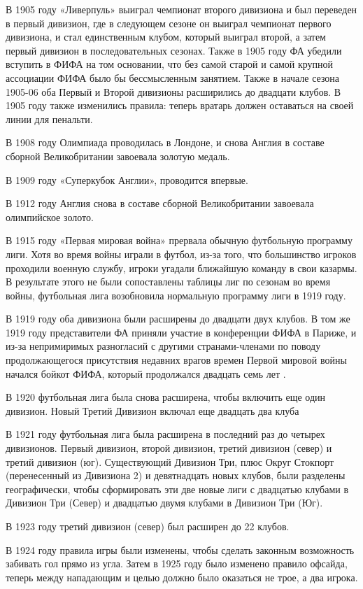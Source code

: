 В 1905 году «Ливерпуль» выиграл чемпионат второго дивизиона и был переведен в первый дивизион, где в следующем сезоне он выиграл чемпионат первого дивизиона, и стал единственным клубом, который выиграл второй, а затем первый дивизион в последовательных сезонах. Также в 1905 году ФА убедили вступить в ФИФА на том основании, что без самой старой и самой крупной ассоциации ФИФА было бы бессмысленным занятием. Также в начале сезона 1905-06 оба Первый и Второй дивизионы расширились до двадцати клубов.  В 1905 году также изменились правила: теперь вратарь должен оставаться на своей линии для пенальти.

В 1908 году Олимпиада проводилась в Лондоне, и снова Англия в составе сборной Великобритании завоевала золотую медаль.

В 1909 году «Суперкубок Англии», проводится впервые.

В 1912 году Англия снова в составе сборной Великобритании завоевала олимпийское золото.

В 1915 году «Первая мировая война» прервала обычную футбольную программу лиги. Хотя во время войны играли в футбол, из-за того, что большинство игроков проходили военную службу, игроки угадали ближайшую команду в свои казармы. В результате этого не были сопоставлены таблицы лиг по сезонам во время войны, футбольная лига возобновила нормальную программу лиги в 1919 году.

В 1919 году оба дивизиона были расширены до двадцати двух клубов. В том же 1919 году представители ФА приняли участие в конференции ФИФА в Париже, и из-за непримиримых разногласий с другими странами-членами по поводу продолжающегося присутствия недавних врагов времен Первой мировой войны начался бойкот ФИФА, который продолжался двадцать семь лет .

В 1920 футбольная лига была снова расширена, чтобы включить еще один дивизион. Новый Третий Дивизион включал еще двадцать два клуба

В 1921 году футбольная лига была расширена в последний раз до четырех дивизионов.  Первый дивизион, второй дивизион, третий дивизион (север) и третий дивизион (юг). Существующий Дивизион Три, плюс Округ Стокпорт (перенесенный из Дивизиона 2) и девятнадцать новых клубов, были разделены географически, чтобы сформировать эти две новые лиги с двадцатью клубами в Дивизион Три (Север) и двадцатью двумя клубами в Дивизион Три (Юг).

В 1923 году третий дивизион (север) был расширен до 22 клубов.

В 1924 году правила игры были изменены, чтобы сделать законным возможность забивать гол прямо из угла. Затем в 1925 году было изменено правило офсайда, теперь между нападающим и целью должно было оказаться не трое, а два игрока. 

